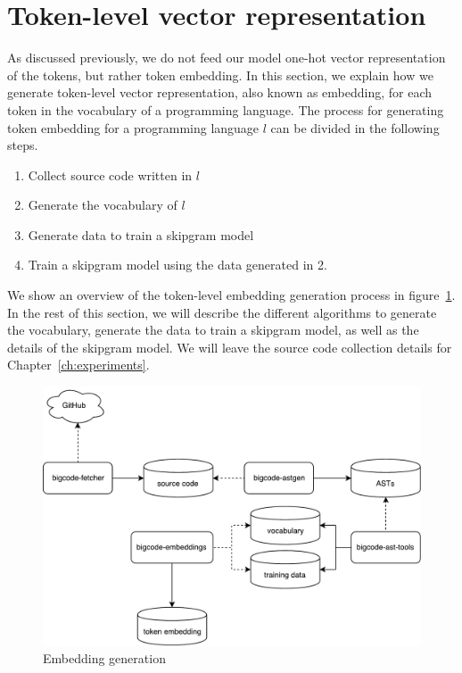 \section{\label{sec:token-representation}Token-level vector representation}
As discussed previously, we do not feed our model one-hot vector representation
of the tokens, but rather token embedding. In this section, we explain how we
generate token-level vector representation, also known as embedding, for each
token in the vocabulary of a programming language. The process for generating
token embedding for a programming language $l$ can be divided in the following
steps.
\begin{enumerate}
\item Collect source code written in $l$
\item Generate the vocabulary of $l$
\item Generate data to train a skipgram model
\item Train a skipgram model using the data generated in 2.
\end{enumerate}
We show an overview of the token-level embedding generation process in
figure~\ref{fig:embedding-generation}. In the rest of this section, we will
describe the different algorithms to generate the vocabulary, generate the data
to train a skipgram model, as well as the details of the skipgram model. We will
leave the source code collection details for Chapter~\ref{ch:experiments}.

\begin{figure}
  \centering\includegraphics[width=14cm]{images/embedding-generation.pdf}
  \caption{\label{fig:embedding-generation} Embedding generation}
\end{figure}
%
